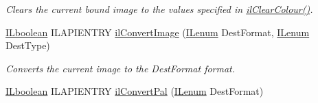\begin{DoxyCompactItemize}
\begin{DoxyCompactList}\small\item\em Clears the current bound image to the values specified in \hyperlink{group__state_gaca1dc7f7b8e61eb134060c9c8a8b72f2}{il\+Clear\+Colour()}. \end{DoxyCompactList}\item 
\hyperlink{group__il__types_gaa6aa7c95cfdc06b4d8601ef832b7bb0a}{I\+Lboolean} I\+L\+A\+P\+I\+E\+N\+T\+R\+Y \hyperlink{group__image__manip_ga82b125402ed12ed399f181165374a7c1}{il\+Convert\+Image} (\hyperlink{group__il__types_ga62ca73445716183ef42b1f3906a45ed0}{I\+Lenum} Dest\+Format, \hyperlink{group__il__types_ga62ca73445716183ef42b1f3906a45ed0}{I\+Lenum} Dest\+Type)
\begin{DoxyCompactList}\small\item\em Converts the current image to the Dest\+Format format. \end{DoxyCompactList}\item 
\hypertarget{group__image__manip_gaf3e055a50d9dcc791b249bfd6152ba58}{\hyperlink{group__il__types_gaa6aa7c95cfdc06b4d8601ef832b7bb0a}{I\+Lboolean} I\+L\+A\+P\+I\+E\+N\+T\+R\+Y \hyperlink{group__image__manip_gaf3e055a50d9dcc791b249bfd6152ba58}{il\+Convert\+Pal} (\hyperlink{group__il__types_ga62ca73445716183ef42b1f3906a45ed0}{I\+Lenum} Dest\+Format)}\label{group__image__manip_gaf3e055a50d9dcc791b249bfd6152ba58}


\end{DoxyCompactItemize}
